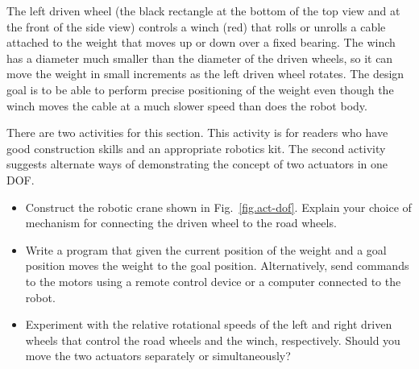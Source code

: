 The left driven wheel (the black rectangle at the bottom of the top view and at the front of the side view) controls a winch (red) that rolls or unrolls a cable attached to the weight that moves up or down over a fixed bearing. The winch  has a diameter much smaller than the diameter of the driven wheels, so it can move the weight in small increments as the left driven wheel rotates. The design goal is to be able to perform precise positioning of the weight even though the winch moves the cable at a much slower speed than does the robot body.

There are two activities for this section. This activity is for readers who have good construction skills and an appropriate robotics kit. The second activity suggests alternate ways of demonstrating the concept of two actuators in one DOF.

\begin{framed}
\begin{itemize}
\item Construct the robotic crane shown in Fig.~\ref{fig.act-dof}. Explain your choice of mechanism for connecting the driven wheel to the road wheels.
\item Write a program that given the current position of the weight and a goal position moves the weight to the goal position. Alternatively, send commands to the motors using a remote control device or a computer connected to the robot. \item Experiment with the relative rotational speeds of the left and right driven wheels that control the road wheels and the winch, respectively. Should you move the two actuators separately or simultaneously?
\end{itemize}
\end{framed}


